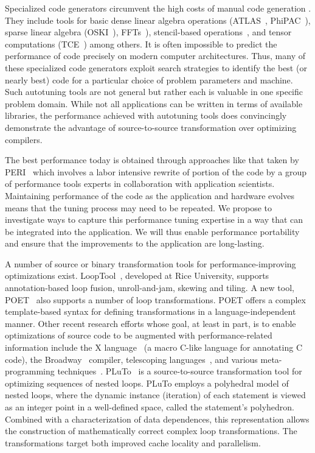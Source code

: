 \documentclass[11pt]{article}
\begin{document}
Specialized code generators circumvent the high costs of manual code generation . They include tools for basic dense linear algebra operations (ATLAS~\cite{WN147}, PhiPAC~\cite{bilmes97optimizing,phipacwww}), sparse linear algebra (OSKI~\cite{vuduc05}), FFTs~\cite{FFTW,Spiral}), stencil-based operations~\cite{kamil06}, and tensor computations (TCE~\cite{TCE}) among others.  It is often impossible to predict the performance of code precisely on modern computer architectures. Thus, many of these specialized code generators exploit search strategies to identify the best (or nearly best) code for a particular choice of problem parameters and machine. Such autotuning tools are not general but rather each is valuable in one specific problem domain. While not all applications can be written in terms of available libraries, the performance achieved with autotuning tools does convincingly demonstrate the advantage of source-to-source transformation over optimizing compilers.

The best performance today is obtained through approaches like that taken by PERI~\cite{PERI} which involves a labor intensive rewrite of portion of the code by a group of performance tools experts in collaboration with application scientists. Maintaining performance of the code as the application and hardware evolves means that the tuning process may need to be repeated. We propose to investigate ways to capture this performance tuning expertise in a way that can be integrated into the application. We will thus enable performance portability and ensure that the improvements to the application are long-lasting.

A number of source or binary transformation tools for performance-improving optimizations exist. LoopTool~\cite{LoopTool}, developed at Rice University, supports annotation-based loop fusion, unroll-and-jam, skewing and tiling.  A new tool, POET~\cite{POET} also supports a number of loop transformations. POET offers a complex template-based syntax for defining transformations in a language-independent manner. Other recent research efforts whose goal, at least in part, is to enable optimizations of source code to be augmented with performance-related information include the X language~\cite{XLanguage} (a macro C-like language for annotating C code), the Broadway~\cite{broadway} compiler,  telescoping languages~\cite{telescopingurl,teleoverview,Ken99}, and various meta-programming techniques~\cite{veldhuizen95,weise93,kiczales91,chiba95}. PLuTo~\cite{Pluto,uday08cc} is a source-to-source transformation tool for optimizing sequences of nested loops. PLuTo employs a polyhedral model of nested loops, where the dynamic instance (iteration) of each statement is viewed as an integer point in a well-defined space, called the statement's polyhedron. Combined with a characterization of data dependences, this representation allows the construction of mathematically correct complex loop transformations. The transformations target both improved cache locality and parallelism.
\end{document}
